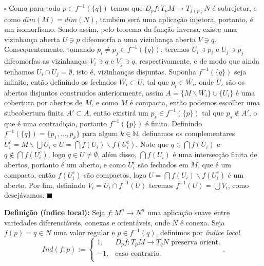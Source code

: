 \documentclass{article}
\begin{document}
	$\square$ Como para todo $p \in f^{-1}(\{q\})$ temos que $D_{p}f : T_{p}M \to T_{f(p)}N$ é sobrejetor, e como $dim(M) = dim(N)$, também será uma aplicação injetora, portanto, é um isomorfismo. Sendo assim, pelo teorema da função inversa, existe uma vizinhança aberta $U \ni p$ difeomorfa a uma vizinhança aberta $V \ni q$. Consequentemente, tomando $p_{i} \neq p_{j} \in f^{-1}(\{q\})$, teremos $U_{i} \ni p_{i}$ e $U_{j} \ni p_{j}$ difeomorfas as vizinhanças $V_{i} \ni q$ e $V_{j} \ni q$, respectivamente, e de modo que ainda tenhamos $U_{i} \cap U_{j} = \emptyset$, isto é, vizinhanças disjuntas. Suponha $f^{-1}(\{q\})$ seja infinito, então definindo os fechados $\overline{W_{i}} \subset U_{i}$ tal que $p_{i} \in \overline{W_{i}}$, onde $U_{i}$ são os abertos disjuntos construidos anteriormente, assim $A = \{M \backslash \overline{W_{i}} \} \cup \{U_{i}\}$ é uma cobertura por abertos de $M$, e como $M$ é compacta, então podemos escolher uma subcobertura finita $A' \subset A$, então existirá um $p_{s} \in f^{-1}(\{p\})$ tal que $p_{s} \notin A'$, o que é uma contradição, portanto $f^{-1}(\{p\})$ é finito. Definindo $f^{-1}(\{q\}) = \{p_{1}, \dots, p_{k}\}$ para algum $k \in \mathbb{N}$, definamos os complementares $U_{i}^{c} = M \backslash \bigcup U_{i}$ e $U = \bigcap f(U_{i}) \backslash f(U_{i}^{c})$. Note que $q \in \bigcap f(U_{i})$ e $q \notin \bigcap f(U_{i}^{c})$, logo  $q \in U \neq \emptyset$, além disso, $\bigcap f(U_{i})$ é uma intersecção finita de abertos, portanto é um aberto, e como $U_{i}^{c}$ são fechados em $M$, que é um compacto, então $f(U_{i}^{c})$ são compactos, logo $U = \bigcap f(U_{i}) \backslash f(U_{i}^{c})$ é um aberto. Por fim, definindo $V_{i} = U_{i} \cap f^{-1}(U)$ teremos $f^{-1}(U) = \bigcup V_{i}$, como desejávamos. $\blacksquare$
	
	\vspace{2mm}
	\textbf{Definição (índice local):} Seja $f : M^{n} \to N^{n}$ uma aplicação suave entre variedades diferenciáveis, conexas e orientáveis, onde $N$ é conexa. Seja $f(p) = q \in N$ uma valor regular e $p \in f^{-1}(q)$, definimos por \textit{índice local}
	$$
	Ind(f; p) := \left\{
	\begin{array}{cc}
	1, & D_{p}f : T_{p}M \to T_{q}N \text{ preserva orient.} \\
	-1, & \text{caso contrario}.\\
	\end{array}.
	\right.
	$$
	
\end{document}
